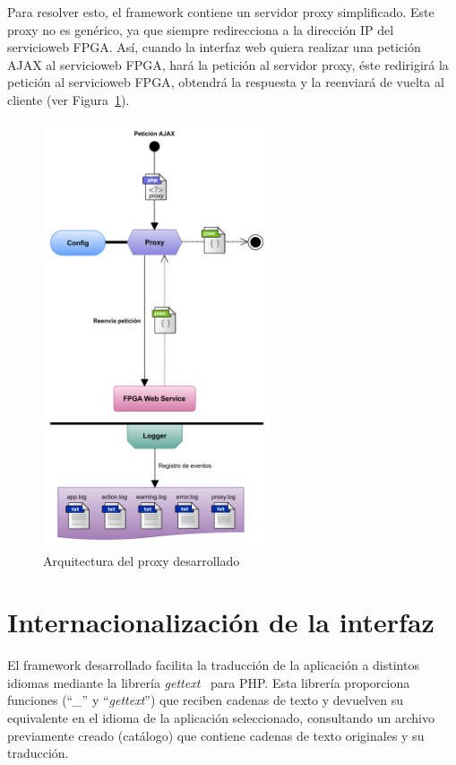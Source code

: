 Para resolver esto, el \gls{framework} contiene un servidor \gls{proxy} simplificado.
Este \gls{proxy} no es genérico, ya que siempre redirecciona a la dirección IP del \gls{servicioweb} \gls{FPGA}.
Así, cuando la interfaz web quiera realizar una petición \gls{AJAX} al \gls{servicioweb} \gls{FPGA}, hará la petición al servidor \gls{proxy}, éste redirigirá la petición al \gls{servicioweb} \gls{FPGA}, obtendrá la respuesta y la reenviará de vuelta al cliente (ver Figura~\ref{fig:proxy}).

\begin{figure}[!htp]
  \centering
  \includegraphics[width=0.6\textwidth,clip=true]{graphics/proxy}
  \caption{Arquitectura del proxy desarrollado}
  \label{fig:proxy}
\end{figure}

\section{Internacionalización de la interfaz\label{extra:mvc:i18n}}

El \gls{framework} desarrollado facilita la traducción de la aplicación a distintos idiomas mediante la librería \textit{gettext}~\cite{gettext} para \gls{PHP}.
Esta librería proporciona funciones (``\textit{\_}'' y ``\textit{gettext}'') que reciben cadenas de texto y devuelven su equivalente en el idioma de la aplicación seleccionado, consultando un archivo previamente creado (catálogo) que contiene cadenas de texto originales y su traducción.

